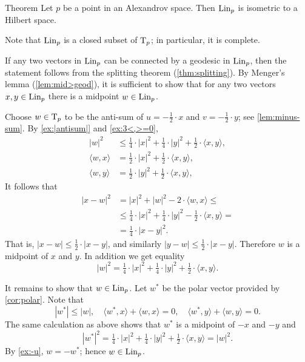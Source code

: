 \begin{thm}{Theorem}\label{thm:lin-subcone}
Let $p$ be a point in an Alexandrov space. 
Then $\mathop{\rm Lin}\nolimits_p$ is isometric to a Hilbert space.
\end{thm}

Note that $\mathop{\rm Lin}\nolimits_p$ is a closed subset of $\mathrm{T}_p$;
in particular, it is complete.

If any two vectors in $\mathop{\rm Lin}\nolimits_p$ can be connected by a geodesic in $\mathop{\rm Lin}\nolimits_p$,
then the statement follows from the splitting theorem (\ref{thm:splitting}).
By Menger's lemma (\ref{lem:mid>geod}), it is sufficient to show that for any two vectors $x,y\in\mathop{\rm Lin}\nolimits_p$
there is a midpoint $w\in \mathop{\rm Lin}\nolimits_p$.

Choose $w\in \mathrm{T}_p$ to be the anti-sum of $u=-\tfrac{1}{2}\cdot x$ and $v=-\tfrac{1}{2}\cdot y$;
see \ref{lem:minus-sum}.
By \ref{ex:|antisum|} and \ref{ex:3<,>=0},
\begin{align*}
|w|^2&\le \tfrac14\cdot |x|^2+\tfrac14\cdot|y|^2+\tfrac12\cdot\langle x,y\rangle,
\\
\langle w,x\rangle&= \tfrac12\cdot|x|^2+\tfrac12\cdot\langle x,y\rangle,
\\
\langle w,y\rangle&= \tfrac12\cdot|y|^2+\tfrac12\cdot\langle x,y\rangle,
\end{align*}
It follows that 
\begin{align*}
|x-w|^2
&= |x|^2+|w|^2-2\cdot\langle w,x\rangle\le
\\
&\le \tfrac14\cdot |x|^2+\tfrac14\cdot|y|^2-\tfrac12\cdot\langle x,y\rangle=
\\
&=\tfrac14\cdot|x-y|^2.
\end{align*}
That is, $|x-w|\le \tfrac12\cdot|x-y|$, and similarly $|y-w|\le \tfrac12\cdot|x-y|$.
Therefore $w$ is a midpoint of $x$ and $y$.
In addition we get equality 
\[|w|^2= \tfrac14\cdot |x|^2+\tfrac14\cdot|y|^2+\tfrac12\cdot\langle x,y\rangle.\]

It remains to show that $w\in\mathop{\rm Lin}\nolimits_p$.
Let $w^*$ be the polar vector provided by \ref{cor:polar}.
Note that 
\[|w^*|\le |w|,
\quad
\langle w^*,x\rangle+\langle w,x\rangle=0,
\quad
\langle w^*,y\rangle+\langle w,y\rangle=0.
\]
The same calculation as above shows that $w^*$ is a midpoint of $-x$ and $-y$ and 
\[|w^*|^2= \tfrac14\cdot |x|^2+\tfrac14\cdot|y|^2+\tfrac12\cdot\langle x,y\rangle=|w|^2.\]
By \ref{ex:-u}, $w=-w^*$;
hence $w\in\mathop{\rm Lin}\nolimits_p$.
\qeds



